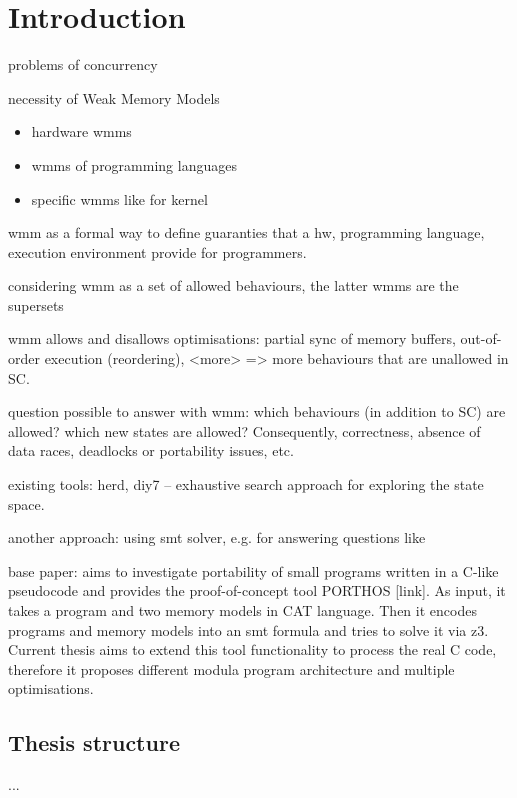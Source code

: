 \chapter{Introduction}
\label{section:introduction}

problems of concurrency

necessity of Weak Memory Models
\begin{itemize}
\item hardware wmms
\item wmms of programming languages
\item specific wmms like for kernel
\end{itemize}

wmm as a formal way to define guaranties that a hw, programming language, execution environment provide for programmers.

considering wmm as a set of allowed behaviours, the latter wmms are the supersets

wmm allows and disallows optimisations: partial sync of memory buffers, out-of-order execution (reordering), <more> => more behaviours that are unallowed in SC.

question possible to answer with wmm: which behaviours (in addition to SC) are allowed? which new states are allowed? Consequently, correctness, absence of data races, deadlocks or portability issues, etc.

existing tools: herd, diy7 -- exhaustive search approach for exploring the state space.

another approach: using smt solver, e.g. for answering questions like 

base paper: aims to investigate portability of small programs written in a C-like pseudocode and provides the proof-of-concept tool PORTHOS [link]. As input, it takes a program and two memory models in CAT language. Then it encodes programs and memory models into an smt formula and tries to solve it via z3. Current thesis aims to extend this tool functionality to process the real C code, therefore it proposes different modula program architecture and multiple optimisations.



\section{Thesis structure}
\label{section:introduction:structure}

...